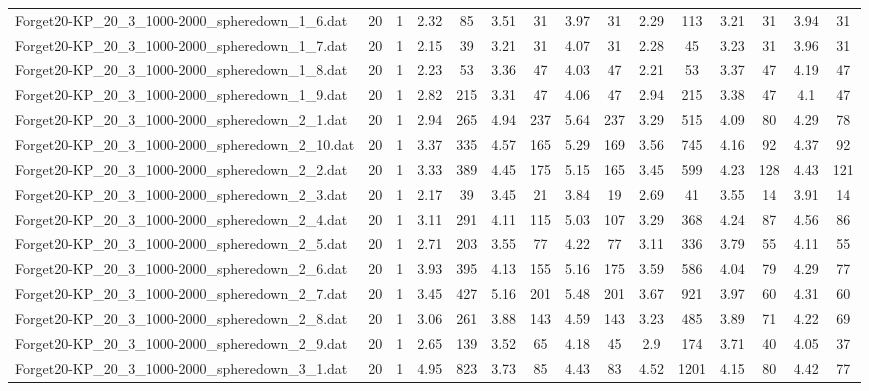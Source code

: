 \begin{table}[!ht]
{\begin{tabular}{lcccccccccccccc}
Forget20-KP\_20\_3\_1000-2000\_spheredown\_1\_6.dat & 20 & 1 & 2.32 & 85 & 3.51 & 31 & 3.97 & 31 & 2.29 & 113 & 3.21 & 31 & 3.94 & 31 \\
Forget20-KP\_20\_3\_1000-2000\_spheredown\_1\_7.dat & 20 & 1 & 2.15 & 39 & 3.21 & 31 & 4.07 & 31 & 2.28 & 45 & 3.23 & 31 & 3.96 & 31 \\
Forget20-KP\_20\_3\_1000-2000\_spheredown\_1\_8.dat & 20 & 1 & 2.23 & 53 & 3.36 & 47 & 4.03 & 47 & 2.21 & 53 & 3.37 & 47 & 4.19 & 47 \\
Forget20-KP\_20\_3\_1000-2000\_spheredown\_1\_9.dat & 20 & 1 & 2.82 & 215 & 3.31 & 47 & 4.06 & 47 & 2.94 & 215 & 3.38 & 47 & 4.1 & 47 \\
Forget20-KP\_20\_3\_1000-2000\_spheredown\_2\_1.dat & 20 & 1 & 2.94 & 265 & 4.94 & 237 & 5.64 & 237 & 3.29 & 515 & 4.09 & 80 & 4.29 & 78 \\
Forget20-KP\_20\_3\_1000-2000\_spheredown\_2\_10.dat & 20 & 1 & 3.37 & 335 & 4.57 & 165 & 5.29 & 169 & 3.56 & 745 & 4.16 & 92 & 4.37 & 92 \\
Forget20-KP\_20\_3\_1000-2000\_spheredown\_2\_2.dat & 20 & 1 & 3.33 & 389 & 4.45 & 175 & 5.15 & 165 & 3.45 & 599 & 4.23 & 128 & 4.43 & 121 \\
Forget20-KP\_20\_3\_1000-2000\_spheredown\_2\_3.dat & 20 & 1 & 2.17 & 39 & 3.45 & 21 & 3.84 & 19 & 2.69 & 41 & 3.55 & 14 & 3.91 & 14 \\
Forget20-KP\_20\_3\_1000-2000\_spheredown\_2\_4.dat & 20 & 1 & 3.11 & 291 & 4.11 & 115 & 5.03 & 107 & 3.29 & 368 & 4.24 & 87 & 4.56 & 86 \\
Forget20-KP\_20\_3\_1000-2000\_spheredown\_2\_5.dat & 20 & 1 & 2.71 & 203 & 3.55 & 77 & 4.22 & 77 & 3.11 & 336 & 3.79 & 55 & 4.11 & 55 \\
Forget20-KP\_20\_3\_1000-2000\_spheredown\_2\_6.dat & 20 & 1 & 3.93 & 395 & 4.13 & 155 & 5.16 & 175 & 3.59 & 586 & 4.04 & 79 & 4.29 & 77 \\
Forget20-KP\_20\_3\_1000-2000\_spheredown\_2\_7.dat & 20 & 1 & 3.45 & 427 & 5.16 & 201 & 5.48 & 201 & 3.67 & 921 & 3.97 & 60 & 4.31 & 60 \\
Forget20-KP\_20\_3\_1000-2000\_spheredown\_2\_8.dat & 20 & 1 & 3.06 & 261 & 3.88 & 143 & 4.59 & 143 & 3.23 & 485 & 3.89 & 71 & 4.22 & 69 \\
Forget20-KP\_20\_3\_1000-2000\_spheredown\_2\_9.dat & 20 & 1 & 2.65 & 139 & 3.52 & 65 & 4.18 & 45 & 2.9 & 174 & 3.71 & 40 & 4.05 & 37 \\
Forget20-KP\_20\_3\_1000-2000\_spheredown\_3\_1.dat & 20 & 1 & 4.95 & 823 & 3.73 & 85 & 4.43 & 83 & 4.52 & 1201 & 4.15 & 80 & 4.42 & 77 \\

\end{tabular}}
\end{table}
